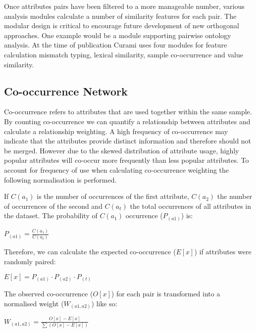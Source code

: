 \documentclass{bmcart}
\begin{document}
Once attributes pairs have been filtered to a more manageable number, various analysis modules calculate a number of similarity features for each pair. The modular design is critical to encourage future development of new orthogonal approaches. One example would be a module supporting pairwise ontology analysis. At the time of publication Curami uses four modules for feature calculation mismatch typing, lexical similarity, sample co-occurrence and value similarity.


\subsection*{Co-occurrence Network}

Co-occurrence refers to attributes that are used together within the same sample. By counting co-occurrence we can quantify a relationship between attributes and calculate a relationship weighting. A high frequency of co-occurrence may indicate that the attributes provide distinct information and therefore should not be merged. However due to the skewed distribution of attribute usage, highly popular attributes will co-occur more frequently than less popular attributes. To account for frequency of use when calculating co-occurrence weighting the following normalisation is performed.


If $C(a_{1})$ is the number of occurrences of the first attribute, $C(a_{2})$ the number of occurrences of the second and $C(a_{t})$ the total occurrences of all attributes in the dataset. The probability of $C(a_{1})$ occurrence ($P_{(a1)}$) is:

$\displaystyle P_{(a1)} = \frac{C(a_{1})}{C(a_{t})}$

Therefore, we can calculate the expected co-occurrence ($E[x]$) if attributes were randomly paired:

$\displaystyle E[x] = P_{(a1)} \cdot P_{(a2)} \cdot P_{(t)}$

The observed co-occurrence ($O[x]$) for each pair is transformed into a normalised weight ($W_{(a1, a2)}$) like so:

$\displaystyle W_{(a1, a2)} = \frac{O[x] - E[x]}{\sum (O[x] - E[x])}$
\end{document}
